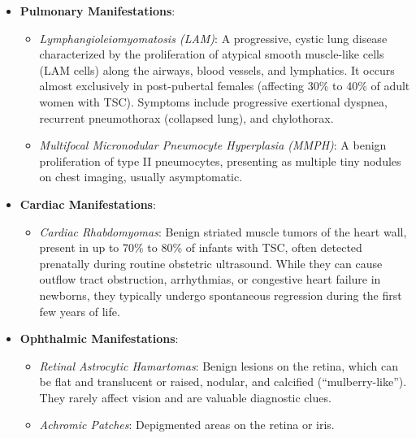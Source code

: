 \begin{itemize}
\begin{itemize}
    \end{itemize}
    \item \textbf{Pulmonary Manifestations}:
    \begin{itemize}
        \item \textit{Lymphangioleiomyomatosis (LAM)}: A progressive, cystic lung disease characterized by the proliferation of atypical smooth muscle-like cells (LAM cells) along the airways, blood vessels, and lymphatics. It occurs almost exclusively in post-pubertal females (affecting 30\% to 40\% of adult women with TSC). Symptoms include progressive exertional dyspnea, recurrent pneumothorax (collapsed lung), and chylothorax.
        \item \textit{Multifocal Micronodular Pneumocyte Hyperplasia (MMPH)}: A benign proliferation of type II pneumocytes, presenting as multiple tiny nodules on chest imaging, usually asymptomatic.
    \end{itemize}
    \item \textbf{Cardiac Manifestations}:
    \begin{itemize}
        \item \textit{Cardiac Rhabdomyomas}: Benign striated muscle tumors of the heart wall, present in up to 70\% to 80\% of infants with TSC, often detected prenatally during routine obstetric ultrasound. While they can cause outflow tract obstruction, arrhythmias, or congestive heart failure in newborns, they typically undergo spontaneous regression during the first few years of life.
    \end{itemize}
    \item \textbf{Ophthalmic Manifestations}:
    \begin{itemize}
        \item \textit{Retinal Astrocytic Hamartomas}: Benign lesions on the retina, which can be flat and translucent or raised, nodular, and calcified (``mulberry-like''). They rarely affect vision and are valuable diagnostic clues.
        \item \textit{Achromic Patches}: Depigmented areas on the retina or iris.
    \end{itemize}
\end{itemize}

